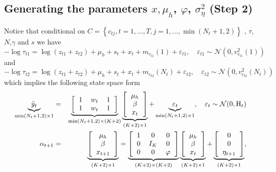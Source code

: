 \documentclass[12pt]{article}
\begin{document}
\subsection{Generating the parameters $x,\mu_{h}$, $\varphi$, $\sigma^{2}_{\eta}$ (Step 2)} 
Notice that conditional on $C=\left\{c_{tj}, t=1, \ldots, T , j=1,\ldots, \min(N_t+1,2) \right\}$ , $\tau$, $N$,$\gamma$ and  $s$ we have 
\begin{equation}
- \log \tau_{t1}  = \log(z_{t1}+z_{t2})+ \mu_{h}+s_t+x_t + m_{ c_{t1}}(1)+ \varepsilon_{t1} , \quad \varepsilon_{t1} \sim \mathcal{N}(0, v^{2}_{c_{t1}}(1))
\end{equation}
and
\begin{equation}
- \log \tau_{t2}  = \log(z_{t1}+z_{t2})+ \mu_{h}+s_t+x_t  + m_{ c_{t2}}(N_t)+ \varepsilon_{t2} , \quad \varepsilon_{t2} \sim \mathcal{N}(0, v^{2}_{c_{t2}}(N_t))
\end{equation}
which implies the following  state space form
\begin{eqnarray}
\underbrace{\tilde{y}_t }_{\min(N_t+1,2)\times 1}&=&  \underbrace{\left[ 
\begin{tabular}{ccc}
1 &$w_t$ &1 \\
 1 &$w_t$ &1
\end{tabular}
\right]}_{\min(N_t+1,2) \times (K+2)}  \underbrace{\left[ 
\begin{tabular}{c}
$\mu_{h}$ \\
$\beta $ \\
$x_{t}$
\end{tabular}
\right]}_{(K+2)\times 1}  + \underbrace{\varepsilon_{t}}_{\min(N_t+1,2)\times 1} , \quad \varepsilon_{t} \sim \mathcal{N}(0, \text{H}_t)  \label{c_eq:ssf1}\\ 
\alpha_{t+1}  &=& \underbrace{\left[ 
\begin{tabular}{c}
$\mu_{h}$ \\
$\beta $ \\
$x_{t+1}$
\end{tabular}
\right]}_{(K+2)\times 1} = \underbrace{\left[ 
\begin{tabular}{ccc}
1 &0& 0 \\
0& $I_{K}$ & 0 \\
0 &0& $\varphi$
\end{tabular}
\right]}_{(K+2)\times(K+2)} 
\underbrace{\left[ 
\begin{tabular}{c}
$\mu_{h}$ \\
$\beta $ \\
$x_{t}$
\end{tabular}
\right]}_{(K+2)\times 1} +\underbrace{\left[ 
\begin{tabular}{c}
0 \\
0 \\
$\eta_{t+1}$
\end{tabular}
\right]}_{(K+2)\times 1}  ,   \label{c_eq:ssf2}
\end{eqnarray}
\end{document}
